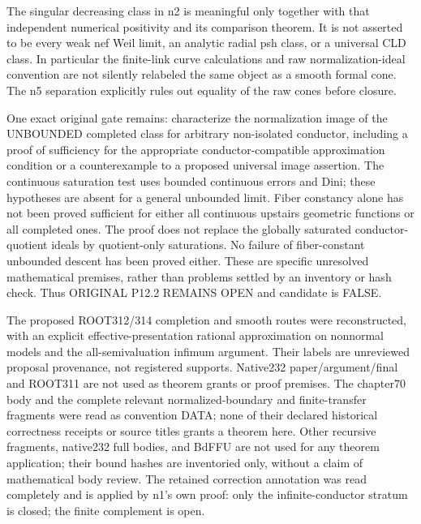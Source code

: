 \documentclass[11pt]{article}
\begin{document}
The singular decreasing class in n2 is meaningful only together with that independent numerical positivity and its comparison theorem. It is not asserted to be every weak nef Weil limit, an analytic radial psh class, or a universal CLD class. In particular the finite-link curve calculations and raw normalization-ideal convention are not silently relabeled the same object as a smooth formal cone. The n5 separation explicitly rules out equality of the raw cones before closure.

One exact original gate remains: characterize the normalization image of the UNBOUNDED completed class for arbitrary non-isolated conductor, including a proof of sufficiency for the appropriate conductor-compatible approximation condition or a counterexample to a proposed universal image assertion. The continuous saturation test uses bounded continuous errors and Dini; these hypotheses are absent for a general unbounded limit. Fiber constancy alone has not been proved sufficient for either all continuous upstairs geometric functions or all completed ones. The proof does not replace the globally saturated conductor-quotient ideals by quotient-only saturations. No failure of fiber-constant unbounded descent has been proved either. These are specific unresolved mathematical premises, rather than problems settled by an inventory or hash check. Thus ORIGINAL P12.2 REMAINS OPEN and candidate is FALSE.

The proposed ROOT312/314 completion and smooth routes were reconstructed, with an explicit effective-presentation rational approximation on nonnormal models and the all-semivaluation infimum argument. Their labels are unreviewed proposal provenance, not registered supports. Native232 paper/argument/final and ROOT311 are not used as theorem grants or proof premises. The chapter70 body and the complete relevant normalized-boundary and finite-transfer fragments were read as convention DATA; none of their declared historical correctness receipts or source titles grants a theorem here. Other recursive fragments, native232 full bodies, and BdFFU are not used for any theorem application; their bound hashes are inventoried only, without a claim of mathematical body review. The retained correction annotation was read completely and is applied by n1's own proof: only the infinite-conductor stratum is closed; the finite complement is open.
\end{document}
